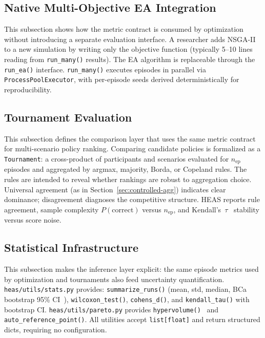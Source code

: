 \documentclass{wscpaperproc}
\begin{document}
\subsection{Native Multi-Objective EA Integration}

This subsection shows how the metric contract is consumed by optimization
without introducing a separate evaluation interface. A researcher adds
NSGA-II to a new simulation by writing only the objective function (typically
5--10 lines reading from \texttt{run\_many()} results). The EA algorithm is
replaceable through the \texttt{run\_ea()} interface. \texttt{run\_many()}
executes episodes in parallel via \texttt{ProcessPoolExecutor}, with per-episode
seeds derived deterministically for reproducibility.

\subsection{Tournament Evaluation}

This subsection defines the comparison layer that uses the same metric contract
for multi-scenario policy ranking. Comparing candidate policies is formalized as a \texttt{Tournament}: a
cross-product of participants and scenarios evaluated for $n_\text{ep}$
episodes and aggregated by argmax, majority, Borda, or Copeland rules. The
rules are intended to reveal whether rankings are robust to aggregation choice.
Universal agreement (as in Section~\ref{sec:controlled-agg}) indicates clear dominance;
disagreement diagnoses the competitive structure.
HEAS reports rule agreement, sample complexity $P(\text{correct})$ versus
$n_\text{ep}$, and Kendall's~$\tau$~\cite{kendall1938new} stability versus
score noise.

\subsection{Statistical Infrastructure}

This subsection makes the inference layer explicit: the same episode metrics
used by optimization and tournaments also feed uncertainty quantification.
\texttt{heas/utils/stats.py} provides: \texttt{summarize\_runs()} (mean, std,
median, BCa bootstrap 95\% CI~\cite{efron1994bootstrap}),
\texttt{wilcoxon\_test()}, \texttt{cohens\_d()}, and \texttt{kendall\_tau()}
with bootstrap CI. \texttt{heas/utils/pareto.py} provides
\texttt{hypervolume()}~\cite{zitzler1998hypervolume} and
\texttt{auto\_reference\_point()}. All utilities accept \texttt{list[float]}
and return structured dicts, requiring no configuration.
\end{document}

